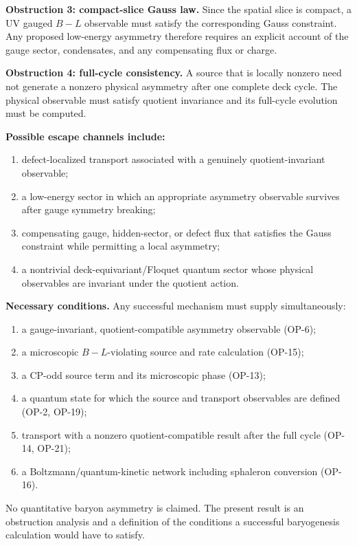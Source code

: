 \documentclass[11pt]{article}
\theoremstyle{canonmath}
\theoremstyle{canonpostulate}
\theoremstyle{canonclaim}
\begin{document}
\textbf{Obstruction 3: compact-slice Gauss law.} Since the spatial slice is compact, a UV gauged $B-L$ observable must satisfy the corresponding Gauss constraint. Any proposed low-energy asymmetry therefore requires an explicit account of the gauge sector, condensates, and any compensating flux or charge.

\textbf{Obstruction 4: full-cycle consistency.} A source that is locally nonzero need not generate a nonzero physical asymmetry after one complete deck cycle. The physical observable must satisfy quotient invariance and its full-cycle evolution must be computed.

\textbf{Possible escape channels include:}
\begin{enumerate}
\item defect-localized transport associated with a genuinely quotient-invariant observable;
\item a low-energy sector in which an appropriate asymmetry observable survives after gauge symmetry breaking;
\item compensating gauge, hidden-sector, or defect flux that satisfies the Gauss constraint while permitting a local asymmetry;
\item a nontrivial deck-equivariant/Floquet quantum sector whose physical observables are invariant under the quotient action.
\end{enumerate}

\textbf{Necessary conditions.} Any successful mechanism must supply simultaneously:
\begin{enumerate}
\item a gauge-invariant, quotient-compatible asymmetry observable (OP-6);
\item a microscopic $B-L$-violating source and rate calculation (OP-15);
\item a CP-odd source term and its microscopic phase (OP-13);
\item a quantum state for which the source and transport observables are defined (OP-2, OP-19);
\item transport with a nonzero quotient-compatible result after the full cycle (OP-14, OP-21);
\item a Boltzmann/quantum-kinetic network including sphaleron conversion (OP-16).
\end{enumerate}

\begin{keyresult}
No quantitative baryon asymmetry is claimed. The present result is an obstruction analysis and a definition of the conditions a successful baryogenesis calculation would have to satisfy.
\end{keyresult}
\end{document}
